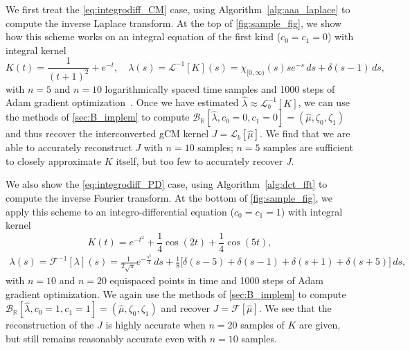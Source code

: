 \documentclass{cams-l} %
\newcommand{\dave}[1]{#1}\newcommand{\davebegin}{}\newcommand{\daveend}{}\newcommand{\george}[1]{#1}
\newcommand{\RR}{\mathbb R}
\newcommand{\cL}{\mathcal L}
\newcommand{\cB}{\mathcal B}
\newcommand{\cF}{\mathcal F}
\theoremstyle{definition}
\theoremstyle{remark}
\numberwithin{equation}{section}
\begin{document}
\dave{We first treat the \ref{eq:integrodiff_CM} case, using Algorithm~\ref{alg:aaa_laplace} to compute the inverse Laplace transform. At the top of \cref{fig:sample_fig}, we show how this scheme works on an integral equation of the first kind ($c_0=c_1=0$) with integral kernel
\begin{equation}\label{eq:Kcm_example}
    K(t) = \frac{1}{(t + 1)^2} + e^{-t}, \quad \lambda(s) = \cL^{-1}[K](s) = \chi_{[0,\infty)}(s)se^{-s}\,ds + \delta(s - 1)\,ds,
\end{equation}
with $n = 5$ and $n = 10$ logarithmically spaced time samples and 1000 steps of Adam gradient optimization~\cite{kingma2014adam}. Once we have estimated $\widehat{\lambda}\approx\cL_b^{-1}[K]$, we can use the methods of \cref{sec:B_implem} to compute $\cB_\RR[\widehat{\lambda},c_0=0,c_1=0] = (\widehat{\mu},\zeta_0,\zeta_1)$ and thus recover the interconverted gCM kernel $J = \cL_b[\widehat{\mu}]$. We find that we are able to accurately reconstruct $J$ with $n = 10$ samples; $n = 5$ samples are sufficient to closely approximate $K$ itself, but too few to accurately recover $J$}.



\dave{We also show the \ref{eq:integrodiff_PD} case, using Algorithm~\ref{alg:dct_fft} to compute the inverse Fourier transform. At the bottom of \cref{fig:sample_fig}, we apply this scheme to an integro-differential equation ($c_0=c_1=1$) with integral kernel
\begin{equation}\label{eq:Kpd_example}
    K(t) = e^{-t^2} + \frac{1}{4}\cos(2t) + \frac{1}{4}\cos(5t),
\end{equation}
\begin{align*}
    \lambda(s) = \cF^{-1}[\lambda](s) = \frac{1}{2\sqrt{\pi}}e^{-\frac{s^2}{4}}\,ds + \frac{1}{8}\Big[\delta(s - 5) + \delta(s - 1) + \delta(s + 1) + \delta(s + 5)\Big]\,ds,
\end{align*}
with $n = 10$ and $n = 20$ equispaced points in time and 1000 steps of Adam gradient optimization. We again use the methods of \cref{sec:B_implem} to compute $\cB_\RR[\widehat{\lambda},c_0=1,c_1=1] = (\widehat{\mu},\zeta_0,\zeta_1)$ and recover $J=\cF[\widehat{\mu}]$. We see that the reconstruction of the $J$ is highly accurate when $n = 20$ samples of $K$ are given, but still remains reasonably accurate even with $n = 10$ samples}.
\end{document}
